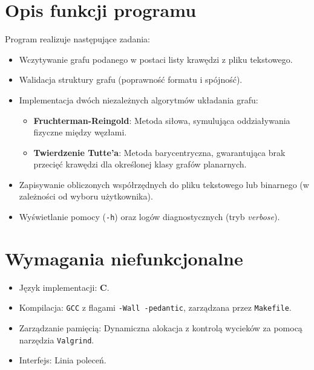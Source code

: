 \documentclass[12pt,a4paper]{article}
\begin{document}
\section{Opis funkcji programu}
Program realizuje następujące zadania:
\begin{itemize}
    \item Wczytywanie grafu podanego w postaci listy krawędzi z pliku tekstowego.
    \item Walidacja struktury grafu (poprawność formatu i spójność).
    \item Implementacja dwóch niezależnych algorytmów układania grafu:
        \begin{itemize}
            \item \textbf{Fruchterman-Reingold}: Metoda siłowa, symulująca oddziaływania fizyczne między węzłami.
            \item \textbf{Twierdzenie Tutte'a}: Metoda barycentryczna, gwarantująca brak przecięć krawędzi dla określonej klasy grafów planarnych.
        \end{itemize}
    \item Zapisywanie obliczonych współrzędnych do pliku tekstowego lub binarnego (w zależności od wyboru użytkownika).
    \item Wyświetlanie pomocy (\texttt{-h}) oraz logów diagnostycznych (tryb \textit{verbose}).
\end{itemize}

\section{Wymagania niefunkcjonalne}
\begin{itemize}
    \item Język implementacji: \textbf{C}.
    \item Kompilacja: \texttt{GCC} z flagami \texttt{-Wall -pedantic}, zarządzana przez \texttt{Makefile}.
    \item Zarządzanie pamięcią: Dynamiczna alokacja z kontrolą wycieków za pomocą narzędzia \texttt{Valgrind}.
    \item Interfejs: Linia poleceń.
\end{itemize}

\newpage
\end{document}
